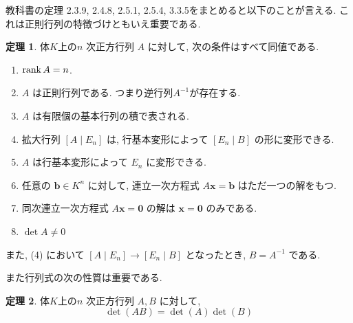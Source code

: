 \documentclass[dvipdfmx,a4paper,11pt]{article} %
\newcommand{\En}{E_n}
\newcommand{\bvec}{\boldsymbol{b}}
\newcommand{\xvec}{\boldsymbol{x}}
\theoremstyle{definition}
\newtheorem{thm}{定理}
\begin{document}
 
 教科書の定理 2.3.9, 2.4.8, 2.5.1, 2.5.4, 3.3.5をまとめると以下のことが言える. 
 これは正則行列の特徴づけともいえ重要である. 
\begin{thm}
体$K$上の$n$ 次正方行列 $A$ に対して, 次の条件はすべて同値である.
\begin{enumerate}[label=\textup{(\arabic*)}]
\item $\rank A=n$.
\item $A$ は正則行列である. つまり逆行列$A^{-1}$が存在する.
\item $A$ は有限個の基本行列の積で表される.
\item 拡大行列 $[A\mid \En]$ は, 行基本変形によって $[\En\mid B]$ の形に変形できる.
\item $A$ は行基本変形によって $\En$ に変形できる.
\item 任意の $\bvec\in K^n$ に対して, 連立一次方程式
\(
A\xvec=\bvec
\)
はただ一つの解をもつ.
\item 同次連立一次方程式
\(
A\xvec=\boldsymbol{0}
\)
の解は $\xvec=\boldsymbol{0}$ のみである.
\item $\det A \neq 0$
\end{enumerate}
また, \textup{(4)} において
\(
[A\mid \En]\longrightarrow [\En\mid B]
\)
となったとき,
\(
B=A^{-1}
\)
である.
\end{thm}

また行列式の次の性質は重要である.
\begin{thm}\cite[定理 3.3.4]{O}
体$K$上の$n$ 次正方行列 $A, B$ に対して,
$$\det(AB)=\det(A) \det(B)$$
\end{thm}
\end{document}
